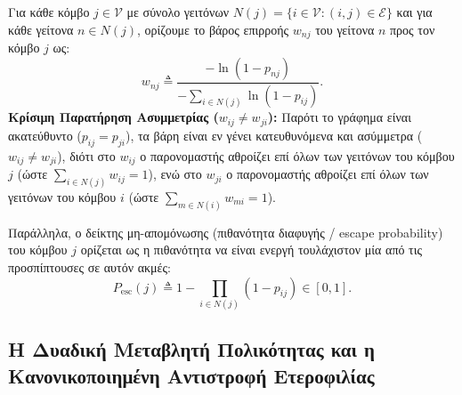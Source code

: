 \documentclass[11pt, a4paper]{article}
\theoremstyle{definition}
\theoremstyle{definition}
\begin{document}
Για κάθε κόμβο $j \in \mathcal{V}$ με σύνολο γειτόνων $N(j) = \{i \in \mathcal{V} : (i,j) \in \mathcal{E}\}$ και για κάθε γείτονα $n \in N(j)$, ορίζουμε το βάρος επιρροής $w_{nj}$ του γείτονα $n$ προς τον κόμβο $j$ ως:
\begin{equation}\label{eq:w_nj_gr}
w_{nj} \triangleq \frac{-\ln(1 - p_{nj})}{-\displaystyle\sum_{i \in N(j)} \ln(1 - p_{ij})}.
\end{equation}
\textbf{Κρίσιμη Παρατήρηση Ασυμμετρίας ($w_{ij} \ne w_{ji}$):} Παρότι το γράφημα είναι ακατεύθυντο ($p_{ij} = p_{ji}$), τα βάρη είναι εν γένει κατευθυνόμενα και ασύμμετρα ($w_{ij} \ne w_{ji}$), διότι στο $w_{ij}$ ο παρονομαστής αθροίζει επί όλων των γειτόνων του κόμβου $j$ (ώστε $\sum_{i \in N(j)} w_{ij} = 1$), ενώ στο $w_{ji}$ ο παρονομαστής αθροίζει επί όλων των γειτόνων του κόμβου $i$ (ώστε $\sum_{m \in N(i)} w_{mi} = 1$).

Παράλληλα, ο δείκτης μη-απομόνωσης (πιθανότητα διαφυγής / escape probability) του κόμβου $j$ ορίζεται ως η πιθανότητα να είναι ενεργή τουλάχιστον μία από τις προσπίπτουσες σε αυτόν ακμές:
\begin{equation}\label{eq:pesc_gr}
P_{\mathrm{esc}}(j) \triangleq 1 - \prod_{i \in N(j)} (1 - p_{ij}) \in [0, 1].
\end{equation}

\subsection{Η Δυαδική Μεταβλητή Πολικότητας και η Κανονικοποιημένη Αντιστροφή Ετεροφιλίας}
\end{document}
